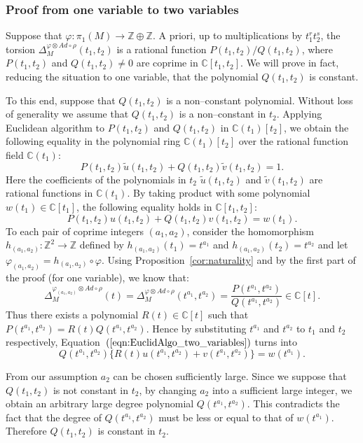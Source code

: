 \documentclass[a4paper]{amsart}
\theoremstyle{plain}
\theoremstyle{definition}
\theoremstyle{remark}
\newcommand{\ZZ}{{\mathbb Z}}
\newcommand{\CC}{{\mathbb C}}
\newcommand{\PolyTors}[2]{\Delta_{#1}^{#2}}
\newcommand{\otAd}[2]{#1 \otimes Ad \circ #2}
\begin{document}
\subsubsection{Proof from one variable to two variables}

Suppose that $\varphi\colon \pi_1(M) \to \ZZ \oplus \ZZ$. A priori, up to
multiplications by $t_1^{r}t_2^{s}$, 
the torsion $\PolyTors{M}{\otAd{\varphi}{\rho}}(t_1, t_2)$ is a
rational function  $P(t_1, t_2) / Q(t_1, t_2)$, where $P(t_1, t_2)$ and
$Q(t_1, t_2) \ne 0$ are coprime in $\CC[t_1, t_2]$. We will prove in fact, reducing
the situation to one variable, that the polynomial $Q(t_1,t_2)$ is
constant.

To this end, suppose that $Q(t_1, t_2)$ is a non--constant
polynomial. Without loss of generality we assume that $Q(t_1, t_2)$ is
a non--constant in $t_2$.  Applying Euclidean algorithm to $P(t_1,
t_2)$ and $Q(t_1, t_2)$ in $\CC(t_1)[t_2]$, we obtain the following
equality in the polynomial ring $\CC(t_1)[t_2]$ over the rational
function field $\CC(t_1)$:
\[
P(t_1, t_2)\tilde u(t_1, t_2) + Q(t_1, t_2) \tilde v(t_1, t_2) = 1.
\]
Here the coefficients of the polynomials in $t_2$ $\tilde u(t_1, t_2)$ and $\tilde v(t_1, t_2)$ are rational
functions in $\CC(t_1)$.  By taking product with some polynomial
$w(t_1) \in \CC[t_1]$, the following equality holds in $\CC[t_1, t_2]$:
\begin{equation}
  \label{eqn:EuclidAlgo_two_variables}
  P(t_1, t_2) u(t_1, t_2) + Q(t_1, t_2) v(t_1, t_2) = w(t_1).
\end{equation}
To each  pair of coprime integers $(a_1, a_2)$, consider the
homomorphism $h_{(a_1, a_2)}\colon \ZZ^2 \to \ZZ$ defined by $h_{(a_1,
  a_2)} (t_1) = t^{a_1}$ and $h_{(a_1, a_2)} (t_2) = t^{a_2}$ and let
$\varphi_{(a_1, a_2)} = h_{(a_1, a_2)} \circ \varphi$.  Using
Proposition~\ref{cor:naturality} and by the first part of the proof (for
one variable), we know that:
\[
\PolyTors{M}{\otAd{\varphi_{(a_1, a_2)}}{\rho}}(t) =
\PolyTors{M}{\otAd{\varphi}{\rho}}(t^{a_1}, t^{a_2}) = \frac{P(t^{a_1}, t^{a_2})}{Q(t^{a_1}, t^{a_2})} \in \CC[t].
\]
Thus there exists a polynomial $R(t) \in \CC[t]$ such that $P(t^{a_1}, t^{a_2})= R(t) Q(t^{a_1},
t^{a_2})$.  Hence by substituting $t^{a_1}$ and $t^{a_2}$ to $t_1$
and $t_2$ respectively, Equation~$(\ref{eqn:EuclidAlgo_two_variables})$ turns into
\[
Q(t^{a_1}, t^{a_2}) \{ R(t) u(t^{a_1}, t^{a_2}) + v(t^{a_1},
t^{a_2})\} = w(t^{a_1}).
\]

From our assumption $a_2$ can be chosen sufficiently large.  Since we
suppose that $Q(t_1, t_2)$ is not constant in $t_2$, by changing $a_2$
into a sufficient large integer, we obtain an arbitrary large degree
polynomial $Q(t^{a_1}, t^{a_2})$.  This contradicts the fact that the
degree of $Q(t^{a_1}, t^{a_2})$ must be less or equal to that of
$w(t^{a_1})$.  Therefore $Q(t_1, t_2)$ is constant in $t_2$.
\end{document}
